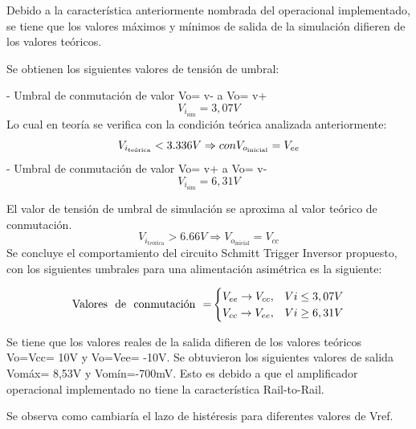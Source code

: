 Debido a la característica anteriormente nombrada del operacional implementado, se tiene que los valores máximos y mínimos de salida de la simulación difieren de los valores teóricos.

Se obtienen los siguientes valores de tensión de umbral:

- Umbral de conmutación de valor Vo= v- a Vo= v+ 
\[V_{i_{\text{sim}}}= 3,07V\]
Lo cual en teoría se verifica con la condición teórica analizada anteriormente:
\[V_{i_{\text{teórica}}} < 3.336V \Rightarrow con \space V_{o_{\text{inicial}}} = V_{ee}\]
- Umbral de conmutación de valor Vo= v+ a Vo= v- 
\[V_{i_{\text{sim}}}= 6,31V\]

El valor de tensión de umbral de simulación se aproxima al valor teórico de conmutación.
\[V_{i_{\text{teórica}}} > 6.66V \Rightarrow V_{o_{\text{inicial}}}= V_{cc} \]
Se concluye el comportamiento del circuito Schmitt Trigger Inversor propuesto, con los siguientes umbrales para una alimentación asimétrica es la siguiente:

\begin{equation}
    \text{Valores \space de \space conmutación \space =}
    \begin{cases}
      V_{ee} \rightarrow V_{cc}, &  Vi\leq3,07V \\
      V_{cc} \rightarrow V_{ee}, &  Vi\geq6,31V
    \end{cases}
  \end{equation}
  
Se tiene que los valores reales de la salida difieren de los valores teóricos Vo=Vcc= 10V y Vo=Vee= -10V. Se obtuvieron los siguientes valores de salida Vomáx= 8,53V y Vomín=-700mV.  Esto es debido a que el amplificador operacional implementado no tiene la característica Rail-to-Rail. 

Se observa como cambiaría el lazo de histéresis para diferentes valores de Vref.

